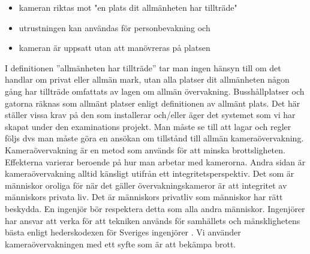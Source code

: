 \begin{itemize}
\item kameran riktas mot "en plats dit allmänheten har tillträde"

\item utrustningen kan användas för personbevakning och

\item kameran är uppsatt utan att manövreras på platsen
\end{itemize}
I definitionen ”allmänheten har tillträde” tar man ingen hänsyn till om det handlar om privat eller allmän mark, utan alla platser dit allmänheten någon gång har tillträde omfattats av lagen om allmän övervakning. Busshållplatser och gatorna räknas som allmänt platser enligt definitionen av allmänt plats.  Det här ställer vissa krav på den som installerar och/eller äger det systemet som vi har skapat under den examinations projekt. Man måste se till att lagar och regler följs dvs man måste göra en ansökan om tillstånd till allmän kameraövervakning. 
Kameraövervakning är en metod som används för att minska brottsligheten. Effekterna varierar beroende på hur man arbetar med kamerorna. Andra sidan är kameraövervakning alltid känsligt utifrån ett integritetsperspektiv. Det som är människor oroliga för när det gäller övervakningskameror är att integritet av människors privata liv.  Det är människors privatliv som människor har rätt beskydda. En ingenjör bör respektera detta som alla andra människor. Ingenjörer har ansvar att verka för att tekniken används för samhällets och mänsklighetens bästa enligt hederskodexen för Sveriges ingenjörer \cite{sverige}. Vi använder kameraövervakningen med ett syfte som är att bekämpa brott. 




